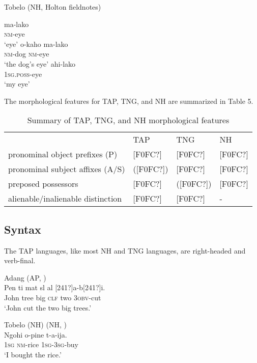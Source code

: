 Tobelo (NH, Holton fieldnotes)

\ea%
  \ea
  \gll ma-lako \\
    \textsc{nm}-eye  \\
\glt `eye'
    \ex
    \gll o-kaho ma-lako \\
    \textsc{nm}-dog \textsc{nm}-eye\\
\glt `the dog's eye'
    \ex
    \gll ahi-lako\\
    \textsc{1sg.poss}-eye\\
\glt `my eye'
  \z
\z

The morphological features for TAP, TNG, and NH are summarized in Table 5.



\begin{table}\centering


\begin{tabular}{llll}& TAP & TNG & NH \\
pronominal object prefixes (P)& [F0FC?] & [F0FC?] & [F0FC?] \\
pronominal subject affixes (A/S)& ([F0FC?]) & [F0FC?] & [F0FC?] \\
preposed possessors& [F0FC?] & ([F0FC?]) & [F0FC?] \\
alienable/inalienable distinction& [F0FC?] & [F0FC?] & - \\

\end{tabular}

\caption{Summary of TAP, TNG, and NH morphological features}\end{table}
\subsection{Syntax}
The TAP languages, like most NH and TNG \citep{Foley2000} languages, are right-headed and verb-final.


\ea%
Adang (AP, \citet[121]{Haan2001})\\
\gll  Pen ti mat{\textepsilon} s{\textepsilon}l al{\textopeno} [241?]a-b{\textopeno}[241?]{\textopeno}i. \\
   John tree big \textsc{clf} two 3\textsc{obv}-cut \\
\glt `John cut the two big trees.'
\z





\ea%
Tobelo (NH) (NH, \citet{Holton2003}) \\
\gll  Ngohi o-pine t-a-ija. \\
 \textsc{1sg} \textsc{nm}-rice \textsc{1sg-3sg}-buy  \\
\glt `I bought the rice.'
\z






